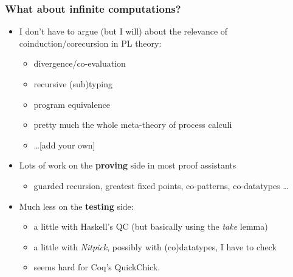 \documentclass{beamer}
\begin{document}
\begin{frame}
  \frametitle{What about infinite computations?}
  \begin{itemize}
  \item I don't have to argue (but I will) about the relevance of
    coinduction/corecursion in PL theory:
    \begin{itemize}
    \item divergence/co-evaluation
    \item recursive (sub)typing
    \item program equivalence
    \item pretty much the whole meta-theory of process calculi
    \item \dots [add your own]
    \end{itemize}
    \pause
  \item Lots of work on the \textbf{proving} side in most proof assistants
    \begin{itemize}
    \item guarded recursion, greatest fixed points, co-patterns, co-datatypes \dots
    \end{itemize}
    \pause
  \item Much less on the \textbf{testing} side:
    \begin{itemize}
    \item a little with Haskell's QC (but basically using the \emph{take} lemma)
    \item a little with \emph{Nitpick}, possibly with (co)datatypes, I have to check
    \item seems hard for Coq's QuickChick.
    \end{itemize}

  \end{itemize}
\end{frame}
\end{document}
